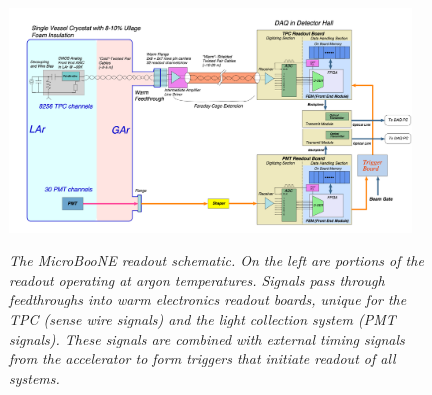 \begin{figure}[ht!]
\centering
	\includegraphics[width=0.95\textwidth]{Figures/UB_readout_scheme.png} \\
\caption{\textit{The MicroBooNE readout schematic. On the left are portions of the readout operating at argon temperatures. Signals pass through feedthroughs into warm electronics readout boards, unique for the TPC (sense wire signals) and the light collection system (PMT signals). These signals are combined with external timing signals from the accelerator to form triggers that initiate readout of all systems.}}\label{readout_scheme_fig}
\end{figure}


